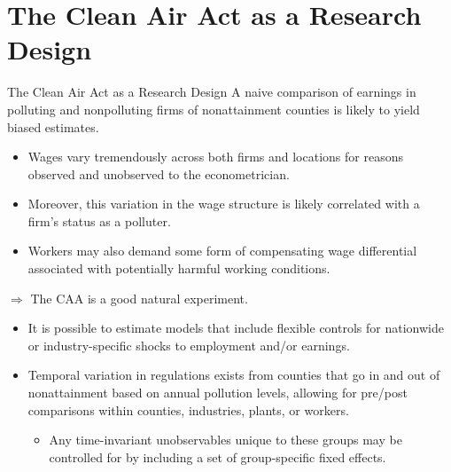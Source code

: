 \documentclass{beamer}
\begin{document}
\section{The Clean Air Act as a Research Design}
\begin{frame}[shrink]
	\transfade %
	\tableofcontents[sectionstyle=show/shaded,subsectionstyle=show/shaded/hide]
	\addtocounter{framenumber}{-1}
\end{frame}
\begin{frame}{The Clean Air Act as a Research Design}
	A naive comparison of earnings in polluting and nonpolluting firms of nonattainment counties is likely to yield biased estimates.
	\begin{itemize}
		\item Wages vary tremendously across both firms and locations for reasons observed and unobserved to the econometrician.
		\item Moreover, this variation in the wage structure is likely correlated with a firm's status as a polluter.
		\item Workers may also demand some form of compensating wage differential associated with potentially harmful working conditions.
	\end{itemize}
	$\Rightarrow$ The CAA is a good natural experiment.
	\begin{itemize}
		\item It is possible to estimate models that include flexible controls for nationwide or industry-specific shocks to employment and/or earnings.
		\item Temporal variation in regulations exists from counties that go in and out of nonattainment based on annual pollution levels, allowing for pre/post comparisons within counties, industries, plants, or workers.
		\begin{itemize}
			\item Any time-invariant unobservables unique to these groups may be controlled for by including a set of group-specific fixed effects.
		\end{itemize}
	\end{itemize}
\end{frame}
\end{document}

